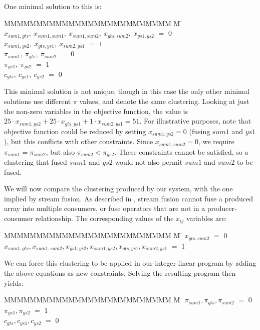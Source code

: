 One minimal solution to this is:
\begin{tabbing}
MMMMMMMMMMMMMMMMMMMMMMMMMM \= M \= \kill
$x_{sum1, gts},~ x_{sum1, sum1},~ x_{sum1, sum2},~ x_{gts, sum2},~ x_{ys1,  ys2}$
    \> $=$ \> $0$ \\
$x_{sum1, ys2},~ x_{gts, ys1},~   x_{sum2, ys1}$
    \> $=$ \> $1$ 
\\[1ex]
$\pi_{sum1},~ \pi_{gts },~ \pi_{sum2}$
    \> $=$ \> $0$ \\
$\pi_{ys1 },~ \pi_{ys2 }$
    \> $=$ \> $1$ 
\\[1ex]
$c_{gts},~ c_{ys1},~ c_{ys2}$           
    \> $=$ \> $0$
\end{tabbing}

This minimal solution is not unique, though in this case the only other minimal solutions use different $\pi$ values, and denote the same clustering. Looking at just the non-zero variables in the objective function, the value is $25 \cdot x_{sum1,ys2} + 25 \cdot x_{gts,ys1} + 1 \cdot x_{sum2, ys1} = 51$. For illustrative purposes, note that objective function could be reduced by setting $x_{sum1,ys2} = 0$ (fusing $sum1$ and $ys1$), but this conflicts with other constraints. Since $x_{sum1, sum2} = 0$, we require $\pi_{sum1} = \pi_{sum2}$, but also \mbox{$\pi_{sum2} < \pi_{ys2}$}. These constraints cannot be satisfied, so a clustering that fused $sum1$ and $ys2$ would not also permit $sum1$ and $sum2$ to be fused.

We will now compare the clustering produced by our system, with the one implied by stream fusion. As described in \cite{lippmeier2013flow}, stream fusion cannot fuse a produced array into multiple consumers, or fuse operators that are not in a producer-consumer relationship. The corresponding values of the $x_{ij}$ variables are:
\begin{tabbing}
MMMMMMMMMMMMMMMMMMMMMMMMMM \= M \= \kill
$x_{gts, sum2}$
    \> $=$ \> $0$ \\
$x_{sum1, gts}, x_{sum1, sum2}, x_{ys1,  ys2}, x_{sum1, ys2}, x_{gts, ys1 }, x_{sum2, ys1}$
    \> $=$ \> $1$
\end{tabbing}

We can force this clustering to be applied in our integer linear program by adding the above equations as new constraints. Solving the resulting program then yields:
\begin{tabbing}
MMMMMMMMMMMMMMMMMMMMMMMMMM \= M \= \kill
$\pi_{sum1}, \pi_{gts }, \pi_{sum2}$
    \> $=$ \> $0$ \\
$\pi_{ys1 }, \pi_{ys2 }$
    \> $=$ \> $1$ \\
$c_{gts}, c_{ys1}, c_{ys2}$           
    \> $=$ \> $0$
\end{tabbing}

